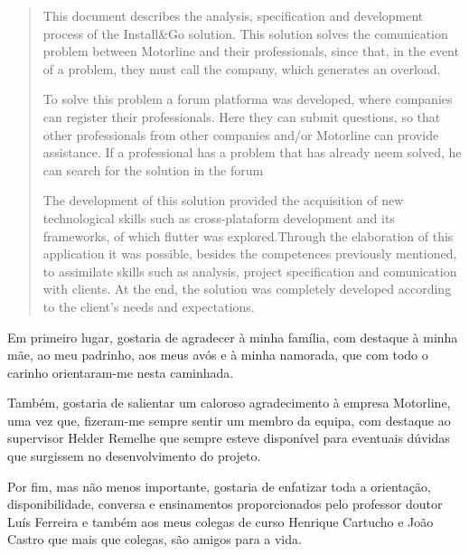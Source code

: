 \documentclass[a4paper,12pt,twoside]{book}
\begin{document}
\begin{abstract}
This document describes the analysis, specification and development process of the Install\&Go solution. This solution solves the comunication problem between Motorline and their professionals, since that, in the event of a problem, they must call the company, which generates an overload.

To solve this problem a forum platforma was developed, where companies can register their professionals. Here they can submit questions, so that other professionals from other companies and/or Motorline can provide assistance. If a professional has a problem that has already neem solved, he can search for the solution in the forum

The development of this solution provided the acquisition of new technological skills such as cross-plataform development and its frameworks, of which flutter was explored.Through the elaboration of this application it was possible, besides the competences previously mentioned, to assimilate skills such as analysis, project specification and comunication with clients. At the end, the solution was completely developed according to the client's needs and expectations.

\end{abstract}

\begin{agradecimentos}

Em primeiro lugar, gostaria de agradecer à minha família, com destaque à minha mãe, ao meu padrinho, aos meus avós e à minha namorada, que com todo o carinho orientaram-me nesta caminhada.

Também, gostaria de salientar um caloroso agradecimento à empresa Motorline, uma vez que, fizeram-me sempre sentir um membro da equipa, com destaque ao supervisor Helder Remelhe que sempre esteve disponível para eventuais dúvidas que surgissem no desenvolvimento do projeto.

Por fim, mas não menos importante, gostaria de enfatizar toda a orientação, disponibilidade, conversa e ensinamentos proporcionados pelo professor doutor Luís Ferreira e também aos meus colegas de curso Henrique Cartucho e João Castro que mais que colegas, são amigos para a vida.
\end{agradecimentos}
\end{document}
